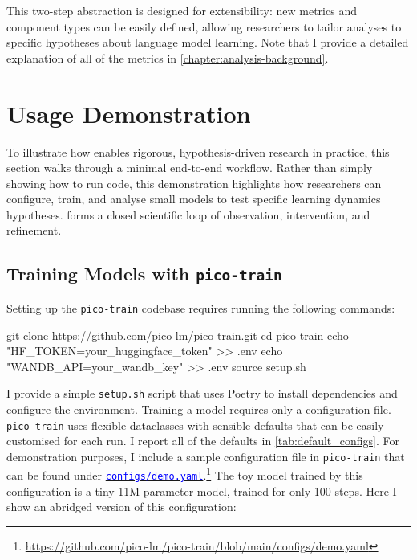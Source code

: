 This two-step abstraction is designed for extensibility: new metrics and component types can be easily defined, allowing researchers to tailor analyses to specific hypotheses about language model learning. Note that I provide a detailed explanation of all of the metrics in \cref{chapter:analysis-background}.

\section{Usage Demonstration} 
\label{sec:usage-demonstration}

To illustrate how \pico enables rigorous, hypothesis-driven research in practice, this section walks through a minimal end-to-end workflow. Rather than simply showing how to run code, this demonstration highlights how researchers can configure, train, and analyse small models to test specific learning dynamics hypotheses. \pico forms a closed scientific loop of observation, intervention, and refinement.

\subsection{Training Models with \texttt{pico-train}}

Setting up the \texttt{pico-train} codebase requires running the following commands:

\begin{center}
    \begin{codelisting}
        git clone https://github.com/pico-lm/pico-train.git
        cd pico-train
        echo "HF_TOKEN=your_huggingface_token" >> .env
        echo "WANDB_API=your_wandb_key" >> .env
        source setup.sh
    \end{codelisting}
\end{center}

I provide a simple \verb|setup.sh| script that uses Poetry \citep{poetry} to install dependencies and configure the environment. Training a model requires only a configuration file. \texttt{pico-train} uses flexible dataclasses with sensible defaults that can be easily customised for each run. I report all of the defaults in \cref{tab:default_configs}. For demonstration purposes, I include a sample configuration file in \texttt{pico-train} that can be found under \href{https://github.com/pico-lm/pico-train/blob/main/configs/demo.yaml}{\textcolor{blue}{\texttt{configs/demo.yaml}}}.\footnote{\url{https://github.com/pico-lm/pico-train/blob/main/configs/demo.yaml}} The toy model trained by this configuration is a tiny 11M parameter model, trained for only 100 steps. Here I show an abridged version of this configuration:


